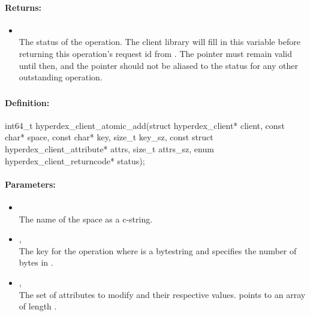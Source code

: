 \paragraph{Returns:}
\begin{itemize}[noitemsep]
\item {}\\
The status of the operation.  The client library will fill in this variable before returning this operation's request id from .  The pointer must remain valid until then, and the pointer should not be aliased to the status for any other outstanding operation.
\end{itemize}

\pagebreak
\subsubsection{}
\label{api:c:atomic_add}


\paragraph{Definition:}
\begin{ccode}
int64_t hyperdex_client_atomic_add(struct hyperdex_client* client,
        const char* space,
        const char* key, size_t key_sz,
        const struct hyperdex_client_attribute* attrs, size_t attrs_sz,
        enum hyperdex_client_returncode* status);
\end{ccode}

\paragraph{Parameters:}
\begin{itemize}[noitemsep]
\item {}\\
The name of the space as a c-string.
\item {}, \\
The key for the operation where  is a bytestring and  specifies the number of bytes in .
\item {}, \\
The set of attributes to modify and their respective values.   points to an array of length .
\end{itemize}

